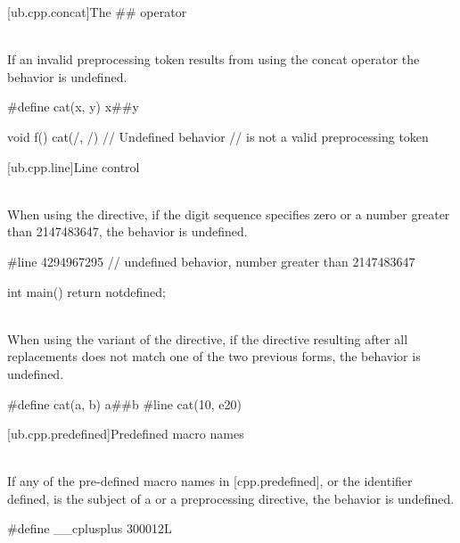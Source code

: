 [ub.cpp.concat]{The \#\# operator}

\pnum
{} \\
If an invalid preprocessing token results from using the concat operator the behavior is undefined.

\pnum
\begin{example}
\begin{codeblock}
#define cat(x, y) x##y

void f() {
  cat(/, /) // Undefined behavior // is not a valid preprocessing token
}
\end{codeblock}
\end{example}


[ub.cpp.line]{Line control}

\pnum
{} \\
When using the  directive, if the digit sequence
specifies zero or a number greater than 2147483647, the behavior is undefined.

\pnum
\begin{example}
\begin{codeblock}
#line 4294967295        // undefined behavior, number greater than 2147483647

int main() { return notdefined; }
\end{codeblock}
\end{example}

\pnum
{} \\
When using the  variant of the  directive, if the directive resulting after all replacements does not match
one of the two previous forms, the behavior is undefined.

\pnum
\begin{example}
\begin{codeblock}
#define cat(a, b) a##b
#line cat(10, e20)
\end{codeblock}
\end{example}

[ub.cpp.predefined]{Predefined macro names}

\pnum
{} \\
If any of the pre-defined macro names in [cpp.predefined], or the identifier defined, is the subject of a 
or a  preprocessing directive, the behavior is undefined.

\pnum
\begin{example}
\begin{codeblock}
#define __cplusplus 300012L
\end{codeblock}
\end{example}

